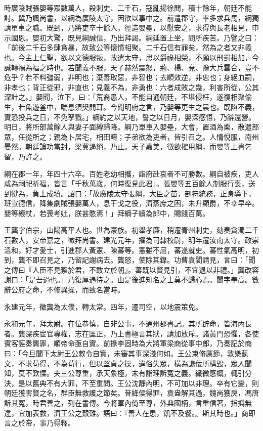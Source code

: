 \begin{pinyinscope}
時廣陵賊張嬰等眾數萬人，殺刺史、二千石，寇亂揚徐閒，積十餘年，朝廷不能討。冀乃諷尚書，以綱為廣陵太守，因欲以事中之。前遣郡守，率多求兵馬，綱獨請單車之職。既到，乃將吏卒十餘人，徑造嬰壘，以慰安之，求得與長老相見，申示國恩。嬰初大驚，既見綱誠信，乃出拜謁。綱延置上坐，問所疾苦。乃譬之曰：「前後二千石多肆貪暴，故致公等懷憤相聚。二千石信有罪矣，然為之者又非義也。今主上仁聖，欲以文德服叛，故遣太守，思以爵祿相榮，不願以刑罰相加，今誠轉禍為福之時也。若聞義不服，天子赫然震怒，荊、楊、兗、豫大兵雲合，豈不危乎？若不料彊弱，非明也；棄善取惡，非智也；去順效逆，非忠也；身絕血嗣，非孝也；背正從邪，非直也；見義不為，非勇也：六者成敗之幾，利害所從，公其深計之。」嬰聞，泣下，曰：「荒裔愚人，不能自通朝廷，不堪侵枉，遂復相聚偷生，若魚遊釜中，喘息須臾閒耳。今聞明府之言，乃嬰等更生之晨也。既陷不義，實恐投兵之日，不免孥戮。」綱約之以天地，誓之以日月，嬰深感悟，乃辭還營。明日，將所部萬餘人與妻子面縛歸降。綱乃單車入嬰壘，大會，置酒為樂，散遣部眾，任從所之；親為卜居宅，相田疇；子弟欲為吏者，皆引召之。人情悅服，南州晏然。朝廷論功當封，梁冀遏絕，乃止。天子嘉美，徵欲擢用綱，而嬰等上書乞留，乃許之。

綱在郡一年，年四十六卒。百姓老幼相攜，詣府赴哀者不可勝數。綱自被疾，吏人咸為祠祀祈福，皆言「千秋萬歲，何時復見此君」。張嬰等五百餘人制服行喪，送到犍為，負土成墳。詔曰：「故廣陵太守張綱，大臣之苗，剖符統務，正身導下，班宣德信，降集劇賊張嬰萬人，息干戈之役，濟蒸庶之困，未升顯爵，不幸早卒。嬰等縗杖，若喪考妣，朕甚愍焉！」拜綱子續為郎中，賜錢百萬。

王龔字伯宗，山陽高平人也。世為豪族。初舉孝廉，稍遷青州刺史，劾奏貪濁二千石數人，安帝嘉之，徵拜尚書。建光元年，擢為司隸校尉，明年遷汝南太守。政崇溫和，好才愛士，引進郡人黃憲、陳蕃等。憲雖不屈，蕃遂就吏。蕃性氣高明，初到，龔不即召見之，乃留記謝病去。龔怒，使除其錄。功曹袁閬請見，言曰：「聞之傳曰『人臣不見察於君，不敢立於朝』。蕃既以賢見引，不宜退以非禮。」龔改容謝曰：「是吾過也。」乃復厚遇待之。由是後進知名之士莫不歸心焉。閬字奉高。數辭公府之命，不修異操，而致名當時。

永建元年，徵龔為太僕，轉太常。四年，遷司空，以地震策免。

永和元年，拜太尉。在位恭慎，自非公事，不通州郡書記。其所辟命，皆海內長者。龔深疾宦官專權，志在匡正，乃上書極言其狀，請加放斥。諸黃門恐懼，各使賓客誣奏龔罪，順帝命亟自實。前掾李固時為大將軍梁商從事中郎，乃奏記於商曰：「今旦聞下太尉王公敕令自實，未審其事深淺何如。王公束脩厲節，敦樂蓺文，不求苟得，不為苟行，但以堅貞之操，違俗失眾，橫為讒佞所構毀，眾人聞知，莫不歎慄。夫三公尊重，承天象極，未有詣理訴冤之義。纖微感概，輒引分決，是以舊典不有大罪，不至重問。王公沈靜內明，不可加以非理。卒有它變，則朝廷獲害賢之名，群臣無救護之節矣。昔絳侯得罪，袁盎解其過，魏尚獲戾，馮唐訴其冤，時君善之，列在書傳。今將軍內倚至尊，外典國柄，言重信著，指撝無違，宜加表救，濟王公之艱難。語曰：『善人在患，飢不及餐。』斯其時也。」商即言之於帝，事乃得釋。


\end{pinyinscope}
